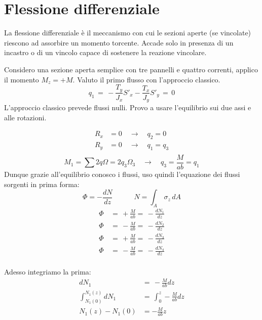 \section{Flessione differenziale}

La flessione differenziale è il meccanismo con cui le sezioni aperte (se vincolate) riescono ad assorbire un momento torcente. Accade solo in presenza di un incastro o di un vincolo capace di sostenere la reazione vincolare.

Considero una sezione aperta semplice con tre pannelli e quattro correnti, applico il momento $M_z = +M$. Valuto il primo flusso con l'approccio classico.
\begin{equation*}
    q_1 \,=\, -\frac{T_y}{J_x}S'_x-\frac{T_x}{J_y}S'_y \,=\,0
\end{equation*}
L'approccio classico prevede flussi nulli. Provo a usare l'equilibrio sui due assi e alle rotazioni.

\begin{align*}
    R_x &=0 \quad\rightarrow\quad q_2=0\\
    R_y &=0 \quad\rightarrow\quad q_1=q_3\\
\end{align*}
\begin{equation*}
    M_1 = \sum2q\Omega = 2q_3\Omega_3\quad\rightarrow\quad q_3=\frac{M}{ab}=q_1
\end{equation*}
Dunque grazie all'equilibrio conosco i flussi, uso quindi l'equazione dei flussi sorgenti in prima forma:
\begin{equation*}
    \Phi = -\frac{dN}{dz}\quad\quad\quad N= \int_A\,\sigma_z\,dA
\end{equation*}
\begin{align*}
    \Phi \,&=\, +\frac{M}{ab}=\,-\frac{dN_1}{dz}\\
    \Phi \,&=\, -\frac{M}{ab}=\,-\frac{dN_2}{dz}\\
    \Phi \,&=\, +\frac{M}{ab}=\,-\frac{dN_3}{dz}\\
    \Phi \,&=\, -\frac{M}{ab}=\,-\frac{dN_4}{dz}\\
\end{align*}

Adesso integriamo la prima:
\begin{align*}
     dN_1\,&=\,-\frac{M}{ab}dz\\
    \int_{N_1(0)}^{N_1(z)}  dN_1\,&=\,\int_0^z-\frac{M}{ab}dz\\
    N_1(z) - N_1(0)  &=-\frac{M}{ab}z
\end{align*}


